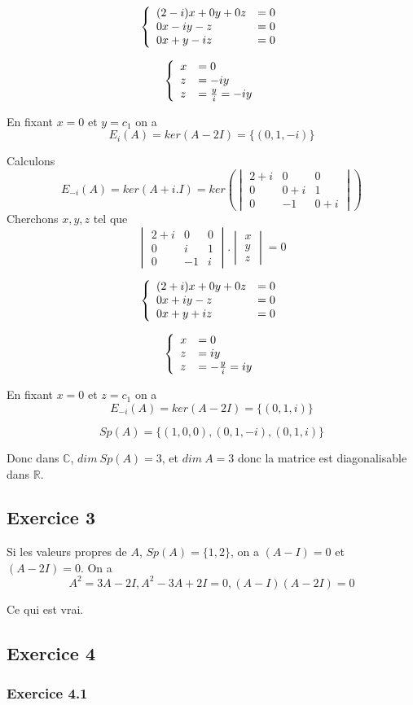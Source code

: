 \documentclass[]{book}
\theoremstyle{definition}
\newcommand{\bb}[1]{\mathbb{#1}}
\newcommand{\R}{\bb{R}}
\newcommand{\C}{\bb{C}}
\begin{document}
$$
\left\{ 
\begin{array}{l l}
(2-i)x  + 0y + 0z & = 0\\
0x  -iy - z & = 0\\
0x +y -iz & = 0\\
\end{array}
\right. 
$$ 

$$
\left\{ 
\begin{array}{l l}
x & = 0\\
z & = -iy \\
z & = \frac{y}{i} = -iy\\
\end{array}
\right. 
$$ 

En fixant $x=0$ et $y=c_1$ on a
$$E_{i}(A)=ker(A-2I) = \{(0,1,-i)\}$$

Calculons 
$$E_{-i}(A)=ker(A+i.I) = ker\left( \begin{vmatrix} 2 + i & 0 & 0 \\ 0 & 0+i  & 1 \\  0 & -1 & 0 + i \end{vmatrix} \right)$$
Cherchons $x,y,z$ tel que
$$\begin{vmatrix} 2+i & 0 & 0 \\ 0 & i & 1 \\  0 & -1 & i \end{vmatrix} . \begin{vmatrix} x \\ y \\  z \end{vmatrix} = 0$$

$$
\left\{ 
\begin{array}{l l}
(2+i)x  + 0y + 0z & = 0\\
0x  + iy - z & = 0\\
0x +y + iz & = 0\\
\end{array}
\right. 
$$ 

$$
\left\{ 
\begin{array}{l l}
x & = 0\\
z & = iy \\
z & = -\frac{y}{i} = iy\\
\end{array}
\right. 
$$ 

En fixant $x=0$ et $z=c_1$ on a
$$E_{-i}(A)=ker(A-2I) = \{(0,1,i)\}$$

$$Sp(A) = \{(1,0,0), (0,1,-i), (0,1,i)\}$$

Donc dans $\C$, $dim\ Sp(A) = 3$, et $dim\ A = 3$ donc la matrice est diagonalisable dans $\R$.

\subsection*{Exercice 3}
Si les valeurs propres de $A$, $Sp(A) = \{1,2\}$, on a $(A-I) = 0$ et $(A-2I) = 0$. On a 
$$A^2 = 3A - 2I, A^2-3A+2I = 0, (A-I)(A-2I) = 0$$

Ce qui est vrai.

\subsection*{Exercice 4}
\subsubsection*{Exercice 4.1}
\end{document}
